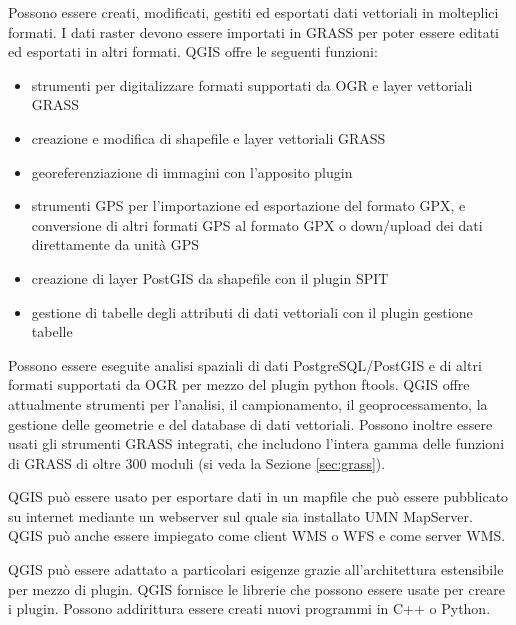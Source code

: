 
Possono essere creati, modificati, gestiti ed esportati dati vettoriali
in molteplici formati. I dati raster devono essere importati in GRASS
per poter essere editati ed esportati in altri formati. QGIS offre
le seguenti funzioni:
\begin{itemize}
\item strumenti per digitalizzare formati supportati da OGR e layer vettoriali GRASS
\item creazione e modifica di shapefile e layer vettoriali GRASS 
\item georeferenziazione di immagini con l'apposito plugin 
\item strumenti GPS per l'importazione ed esportazione del formato GPX, e conversione di altri formati GPS al formato GPX o down/upload dei dati direttamente da unità GPS
\item creazione di layer PostGIS da shapefile con il plugin SPIT 
\item gestione di tabelle degli attributi di dati vettoriali con il plugin gestione tabelle
\end{itemize}


Possono essere eseguite analisi spaziali di dati PostgreSQL/PostGIS e di altri
formati supportati da OGR per mezzo del plugin python ftools. QGIS
offre attualmente strumenti per l'analisi, il campionamento, il geoprocessamento,
la gestione delle geometrie e del database di dati vettoriali. Possono
inoltre essere usati gli strumenti GRASS integrati, che includono
l'intera gamma delle funzioni di GRASS di oltre 300 moduli (si veda la Sezione \ref{sec:grass}).


QGIS può essere usato per esportare dati in un mapfile che può essere
pubblicato su internet mediante un webserver sul quale sia installato
UMN MapServer. QGIS può anche essere impiegato come client WMS o
WFS e come server WMS. 


QGIS può essere adattato a particolari esigenze grazie all'architettura
estensibile per mezzo di plugin. QGIS fornisce le librerie che possono
essere usate per creare i plugin. Possono addirittura essere creati
nuovi programmi in C++ o Python.

